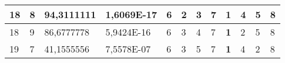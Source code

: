 \documentclass[conference]{IEEEtran}
\begin{document}
\begin{table*}[]
\begin{tabular}{|llll|llllllll|}
\multicolumn{1}{|l|}{18}                                                    & \multicolumn{1}{l|}{8}                                                        & \multicolumn{1}{l|}{94,3111111}                                                   & 1,6069E-17                     & \multicolumn{1}{l|}{6}                                                  & \multicolumn{1}{l|}{2}                                                  & \multicolumn{1}{l|}{3}                                                  & \multicolumn{1}{l|}{7}                                                  & \multicolumn{1}{l|}{\textbf{1}}                                         & \multicolumn{1}{l|}{4}                                                  & \multicolumn{1}{l|}{5}                                                  & 8                          \\ \hline
\multicolumn{1}{|l|}{18}                                                    & \multicolumn{1}{l|}{9}                                                        & \multicolumn{1}{l|}{86,6777778}                                                   & 5,9424E-16                     & \multicolumn{1}{l|}{6}                                                  & \multicolumn{1}{l|}{3}                                                  & \multicolumn{1}{l|}{4}                                                  & \multicolumn{1}{l|}{7}                                                  & \multicolumn{1}{l|}{\textbf{1}}                                         & \multicolumn{1}{l|}{2}                                                  & \multicolumn{1}{l|}{5}                                                  & 8                          \\ \hline
\multicolumn{1}{|l|}{19}                                                    & \multicolumn{1}{l|}{7}                                                        & \multicolumn{1}{l|}{41,1555556}                                                   & 7,5578E-07                     & \multicolumn{1}{l|}{6}                                                  & \multicolumn{1}{l|}{3}                                                  & \multicolumn{1}{l|}{5}                                                  & \multicolumn{1}{l|}{7}                                                  & \multicolumn{1}{l|}{\textbf{1}}                                         & \multicolumn{1}{l|}{4}                                                  & \multicolumn{1}{l|}{2}                                                  & 8                          \\ \hline

\end{tabular}
\end{table*}
\end{document}
